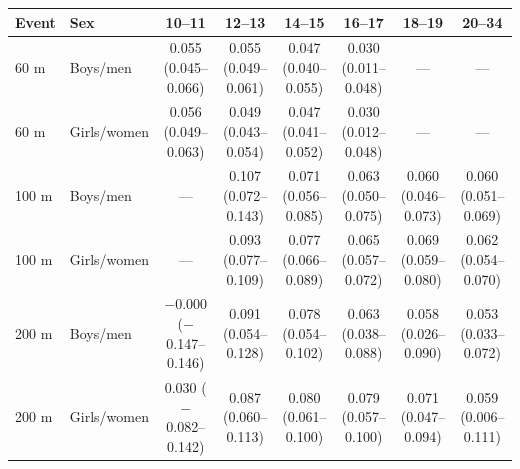 \begin{tabular}{llcccccc}
\toprule
Event & Sex & 10--11 & 12--13 & 14--15 & 16--17 & 18--19 & 20--34 \\
\midrule
60 m & Boys/men & 0.055 (0.045--0.066) & 0.055 (0.049--0.061) & 0.047 (0.040--0.055) & 0.030 (0.011--0.048) & --- & --- \\
60 m & Girls/women & 0.056 (0.049--0.063) & 0.049 (0.043--0.054) & 0.047 (0.041--0.052) & 0.030 (0.012--0.048) & --- & --- \\
100 m & Boys/men & --- & 0.107 (0.072--0.143) & 0.071 (0.056--0.085) & 0.063 (0.050--0.075) & 0.060 (0.046--0.073) & 0.060 (0.051--0.069) \\
100 m & Girls/women & --- & 0.093 (0.077--0.109) & 0.077 (0.066--0.089) & 0.065 (0.057--0.072) & 0.069 (0.059--0.080) & 0.062 (0.054--0.070) \\
200 m & Boys/men & $-$0.000 ($-$0.147--0.146) & 0.091 (0.054--0.128) & 0.078 (0.054--0.102) & 0.063 (0.038--0.088) & 0.058 (0.026--0.090) & 0.053 (0.033--0.072) \\
200 m & Girls/women & 0.030 ($-$0.082--0.142) & 0.087 (0.060--0.113) & 0.080 (0.061--0.100) & 0.079 (0.057--0.100) & 0.071 (0.047--0.094) & 0.059 (0.006--0.111) \\
\bottomrule
\end{tabular}
